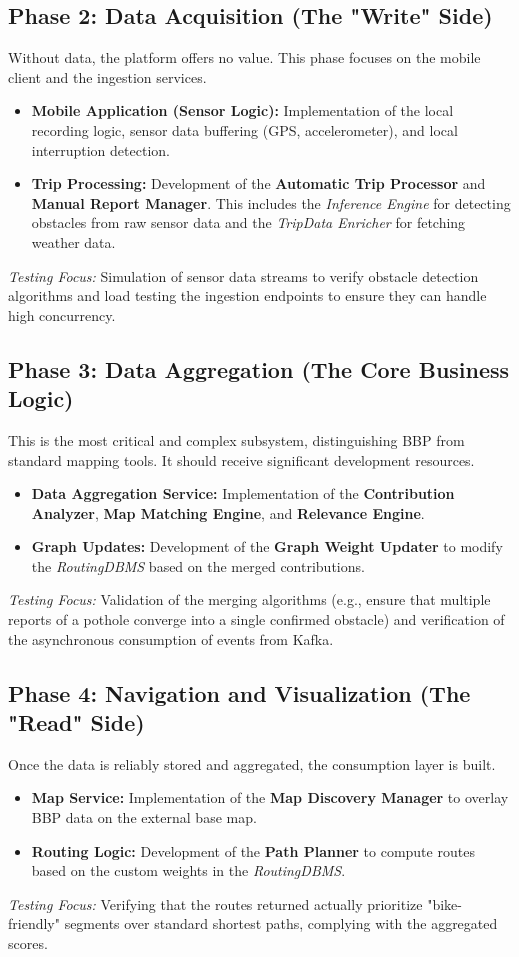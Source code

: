 \subsection{Phase 2: Data Acquisition (The "Write" Side)}
Without data, the platform offers no value. This phase focuses on the mobile client and the ingestion services.
\begin{itemize}
    \item \textbf{Mobile Application (Sensor Logic):} Implementation of the local recording logic, sensor data buffering (GPS, accelerometer), and local interruption detection.
    \item \textbf{Trip Processing:} Development of the \textbf{Automatic Trip Processor} and \textbf{Manual Report Manager}. This includes the \textit{Inference Engine} for detecting obstacles from raw sensor data and the \textit{TripData Enricher} for fetching weather data.
\end{itemize}
\textit{Testing Focus:} Simulation of sensor data streams to verify obstacle detection algorithms and load testing the ingestion endpoints to ensure they can handle high concurrency.

\subsection{Phase 3: Data Aggregation (The Core Business Logic)}
This is the most critical and complex subsystem, distinguishing BBP from standard mapping tools. It should receive significant development resources.
\begin{itemize}
    \item \textbf{Data Aggregation Service:} Implementation of the \textbf{Contribution Analyzer}, \textbf{Map Matching Engine}, and \textbf{Relevance Engine}.
    \item \textbf{Graph Updates:} Development of the \textbf{Graph Weight Updater} to modify the \textit{RoutingDBMS} based on the merged contributions.
\end{itemize}
\textit{Testing Focus:} Validation of the merging algorithms (e.g., ensure that multiple reports of a pothole converge into a single confirmed obstacle) and verification of the asynchronous consumption of events from Kafka.

\subsection{Phase 4: Navigation and Visualization (The "Read" Side)}
Once the data is reliably stored and aggregated, the consumption layer is built.
\begin{itemize}
    \item \textbf{Map Service:} Implementation of the \textbf{Map Discovery Manager} to overlay BBP data on the external base map.
    \item \textbf{Routing Logic:} Development of the \textbf{Path Planner} to compute routes based on the custom weights in the \textit{RoutingDBMS}.
\end{itemize}
\textit{Testing Focus:} Verifying that the routes returned actually prioritize "bike-friendly" segments over standard shortest paths, complying with the aggregated scores.

